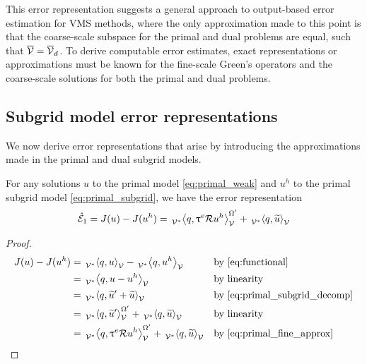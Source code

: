 This error representation suggests a general approach
to output-based error estimation for VMS methods, where
the only approximation made to this point is that the
coarse-scale subspace for the primal and dual problems
are equal, such that $\overline{\mathcal{V}} = \overline{\mathcal{V}}_d$. To derive
computable error estimates, exact representations or
approximations must be known for the fine-scale
Green's operators and the coarse-scale solutions for
both the primal and dual problems.

\subsection{Subgrid model error representations}

We now derive error representations that arise by
introducing the approximations made in the primal
and dual subgrid models.

\begin{prop}
For any solutions $u$ to the primal model \eqref{eq:primal_weak}
and $u^h$ to the primal subgrid model \eqref{eq:primal_subgrid},
we have the error representation
%
\begin{gather}
\hat{\mathcal{E}}_1 = J(u) - J(u^h) =
\,{}_{\mathcal{V}^*}^{}\!\left< {q}, {\uptau^e \mathcal{R} u^h} \right>_{\mathcal{V}}^{\Omega'} + \,{}_{\mathcal{V}^*}^{}\!\left< {q}, {\widetilde{u}} \right>_{\mathcal{V}}
\label{eq:representation_1}
\end{gather}
%
\end{prop}

\begin{proof}
%
\begin{gather*}
\begin{aligned}
J(u) - J(u^h) &=
\paira{q}{u} - \paira{q}{u^h}
&& \text{by \eqref{eq:functional}} \\
&= \paira{q}{u - u^h}
&& \text{by linearity} \\
&= \paira{q}{\tilde{u}' + \tilde{u}}
&& \text{by \eqref{eq:primal_subgrid_decomp}} \\
&= \paira{q}{\tilde{u}'}^{\Omega'} + \paira{q}{\tilde{u}}
&& \text{by linearity} \\
&= \paira{q}{\uptau^e \R u^h}^{\Omega'} + \paira{q}{\tilde{u}}
&& \text{by \eqref{eq:primal_fine_approx}} \\
\end{aligned}
\end{gather*}
%
\end{proof}

